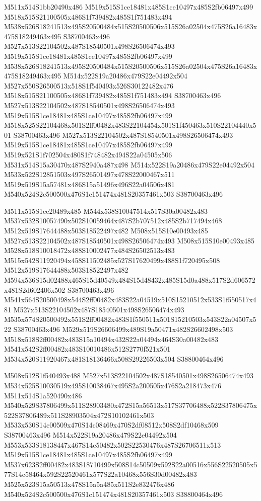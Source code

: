 \documentclass{article}
\begin{document}
\begin{multicols}{2}
M511x514S1bb20490x486 M519x515S1ce18481x485S1ce10497x485S2fb06497x499 M518x515S21100505x486S1f739482x485S1f751483x494 M538x526S18241513x495S20500484x515S20500506x515S26a02504x475S26a16483x475S18249463x495 S38700463x496 M527x513S22104502x487S18540501x498S26506474x493 M519x515S1ce18481x485S1ce10497x485S2fb06497x499 M538x526S18241513x495S20500484x515S20500506x515S26a02504x475S26a16483x475S18249463x495 M514x522S19a20486x479S22e04492x504 M527x550S26500513x518S1f540493x526S30122482x476 M518x515S21100505x486S1f739482x485S1f751483x494 S38700463x496 M527x513S22104502x487S18540501x498S26506474x493 M519x515S1ce18481x485S1ce10497x485S2fb06497x499 M518x525S22104468x501S2ff00482x483S22104454x501S1f450463x510S22104440x501 S38700463x496 M527x513S22104502x487S18540501x498S26506474x493 M519x515S1ce18481x485S1ce10497x485S2fb06497x499 M519x521S1f702504x480S1f748482x494S22a04505x506 M531x514S15a30470x487S2940a487x498 M514x522S19a20486x479S22e04492x504 M533x522S12851503x497S26501497x478S22000467x511 M519x519S15a57481x486S15a51496x496S22a04506x481 M540x524S2c500500x476S1c151474x481S20357461x503 S38700463x496

M511x515S1ce20489x485 M544x538S10047514x517S30a00482x483 M537x532S10057490x502S10059464x487S2b707512x485S2b717494x468 M512x519S17644488x503S18522497x482 M508x515S10e00493x485 M527x513S22104502x487S18540501x498S26506474x493 M508x515S10e00493x485 M528x518S10018472x488S10002477x484S26502513x483 M515x542S11920494x458S11502485x527S17620499x488S1f720495x508 M512x519S17644488x503S18522497x482 M594x536S15d02488x465S15d40549x484S15d48432x485S15d0a488x517S2d606572x481S2d602406x502 S38700463x496 M541x564S20500498x544S2ff00482x483S22a04519x510S15210512x533S1f550517x481 M527x513S22104502x487S18540501x498S26506474x493 M535x574S20500492x551S2ff00482x483S1f550511x501S15210503x543S22a04507x522 S38700463x496 M529x519S26606499x489S19a50471x482S26602498x503 M518x518S2ff00482x483S15a10494x432S22a04494x464S30a00482x483 M541x542S2ff00482x483S10010486x512S2770f521x501 M534x520S11920467x481S18136466x508S29226503x504 S38800464x496

M508x512S1f540493x488 M527x513S22104502x487S18540501x498S26506474x493 M534x525S10030519x495S10038467x495S2a200505x476S2a218473x476 M511x514S1a520490x486 M540x529S37806499x511S28903480x472S15a56513x517S37706488x522S37806475x522S37806489x511S28903504x472S10102461x503 M533x530S14c00509x470S14c08469x470S2df08512x508S2df10468x509 S38700463x496 M514x522S19a20486x479S22e04492x504 M553x533S18138447x467S14c50482x502S22530476x487S26706511x513 M519x515S1ce18481x485S1ce10497x485S2fb06497x499 M537x623S2ff00482x483S18710499x508S14c50509x592S22a00516x556S22520505x577S14c58464x592S22520461x577S22a10468x556S30d00482x483 M525x523S15a50513x478S15a5a485x511S2e832476x486 M540x524S2c500500x476S1c151474x481S20357461x503 S38800464x496


\end{multicols}
\end{document}
